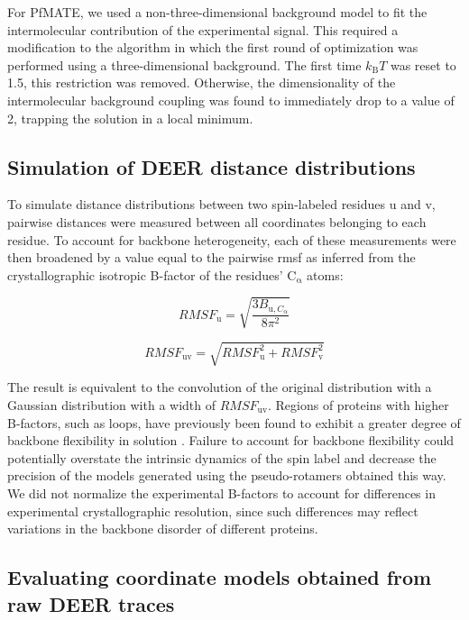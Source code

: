 For PfMATE, we used a non-three-dimensional background model to fit the intermolecular contribution of the experimental signal. This required a modification to the algorithm in which the first round of optimization was performed using a three-dimensional background. The first time $k_{\mathup{B}}T$ was reset to 1.5, this restriction was removed. Otherwise, the dimensionality of the intermolecular background coupling was found to immediately drop to a value of 2, trapping the solution in a local minimum.

\subsection{Simulation of DEER distance distributions}

To simulate distance distributions between two spin-labeled residues u and v, pairwise distances were measured between all coordinates belonging to each residue. To account for backbone heterogeneity, each of these measurements were then broadened by a value equal to the pairwise \gls{rmsf} as inferred from the crystallographic isotropic B-factor of the residues’ $\mathrm{C_{\upalpha}}$ atoms:

\begin{equation}
    RMSF_{\mathup{u}}=\sqrt{\frac{3 B_{\mathup{u}, C_{\upalpha}}}{8 \pi^{2}}}
\end{equation}

\begin{equation}
    RMSF_{\mathup{uv}}=\sqrt{RMSF_{\mathup{u}}^{2}+RMSF_{\mathup{v}}^{2}}
\end{equation}

The result is equivalent to the convolution of the original distribution with a Gaussian distribution with a width of $RMSF_{\mathup{uv}}$. Regions of proteins with higher B-factors, such as loops, have previously been found to exhibit a greater degree of backbone flexibility in solution \citep*{Billeter1992, Powers1993, Yang2007}. Failure to account for backbone flexibility could potentially overstate the intrinsic dynamics of the spin label and decrease the precision of the models generated using the pseudo-rotamers obtained this way. We did not normalize the experimental B-factors to account for differences in experimental crystallographic resolution, since such differences may reflect variations in the backbone disorder of different proteins.

\subsection{Evaluating coordinate models obtained from raw DEER traces}

